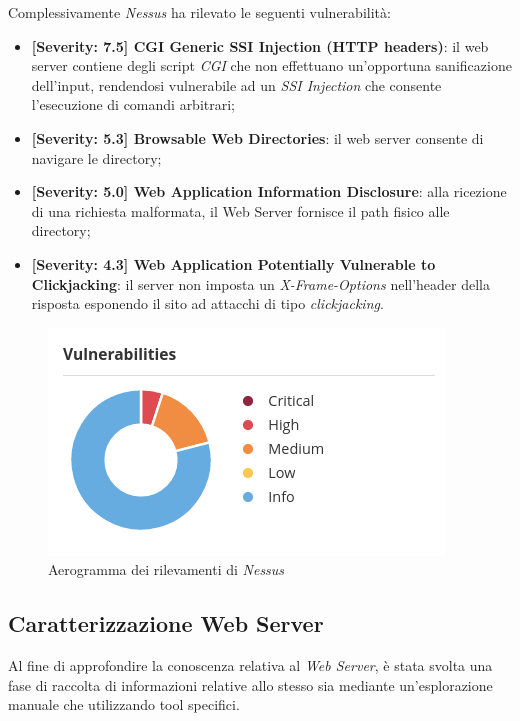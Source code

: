 Complessivamente \emph{Nessus} ha rilevato le seguenti vulnerabilità:
\begin{itemize}
    \item \textbf{[Severity: 7.5] CGI Generic SSI Injection (HTTP headers)}: il web server contiene degli script \emph{CGI} che non effettuano un'opportuna sanificazione dell'input, rendendosi vulnerabile ad un \emph{SSI Injection} che consente l'esecuzione di comandi arbitrari;
    \item \textbf{[Severity: 5.3] Browsable Web Directories}: il web server consente di navigare le directory;
    \item \textbf{[Severity: 5.0] Web Application Information Disclosure}: alla ricezione di una richiesta malformata, il Web Server fornisce il path fisico alle directory;
    \item \textbf{[Severity: 4.3] Web Application Potentially Vulnerable to Clickjacking}: il server non imposta un \emph{X-Frame-Options} nell'header della risposta esponendo il sito ad attacchi di tipo \emph{clickjacking}.
\end{itemize}
\begin{figure}[h]
    \centering
    \includegraphics[scale=0.8]{capitoli/images/nessus-chart.png}
    \caption{Aerogramma dei rilevamenti di \emph{Nessus}}
    \label{fig:nessus-chart}
\end{figure}
\subsection{Caratterizzazione Web Server}
Al fine di approfondire la conoscenza relativa al \emph{Web Server}, è stata svolta una fase di raccolta di informazioni relative allo stesso sia mediante un'esplorazione manuale che utilizzando tool specifici.
